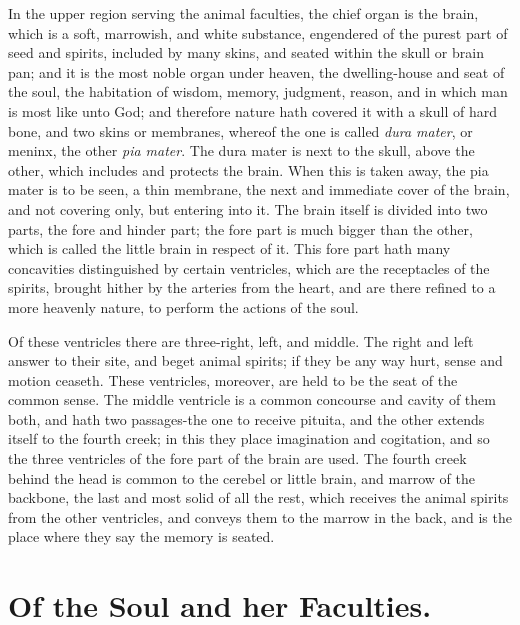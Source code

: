{In the upper region serving the animal faculties, the chief organ is
the brain, which is a soft, marrowish, and white substance, engendered
of the purest part of seed and spirits, included by many skins, and
seated within the skull or brain pan; and it is the most noble organ
under heaven, the dwelling-house and seat of the soul, the habitation
of wisdom, memory, judgment, reason, and in which man is most like unto
God; and therefore nature hath covered it with a skull of hard bone,
and two skins or membranes, whereof the one is called \emph{dura mater}, or
meninx, the other \emph{pia mater}. The dura mater is next to the skull,
above the other, which includes and protects the brain. When this is
taken away, the pia mater is to be seen, a thin membrane, the next and
immediate cover of the brain, and not covering only, but entering into
it. The brain itself is divided into two parts, the fore and hinder
part; the fore part is much bigger than the other, which is called the
little brain in respect of it. This fore part hath many concavities
distinguished by certain ventricles, which are the receptacles of the
spirits, brought hither by the arteries from the heart, and are there
refined to a more heavenly nature, to perform the actions of the soul.

Of these ventricles there are three-right, left, and middle. The right
and left answer to their site, and beget animal spirits; if they be any
way hurt, sense and motion ceaseth. These ventricles, moreover, are
held to be the seat of the common sense. The middle ventricle is a
common concourse and cavity of them both, and hath two passages-the one
to receive pituita, and the other extends itself to the fourth creek;
in this they place imagination and cogitation, and so the three
ventricles of the fore part of the brain are used. The fourth creek
behind the head is common to the cerebel or little brain, and marrow of
the backbone, the last and most solid of all the rest, which receives
the animal spirits from the other ventricles, and conveys them to the
marrow in the back, and is the place where they say the memory is
seated.

\section{Of the Soul and her Faculties.}

}
